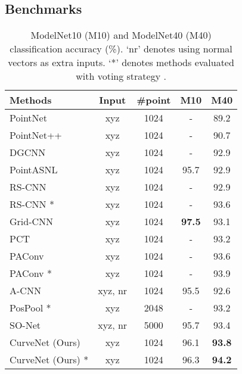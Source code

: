 \documentclass[10pt,twocolumn,letterpaper]{article}
\theoremstyle{definition}
\begin{document}
\subsection{Benchmarks}

\begin{table} 
	\begin{center}
	\caption{ModelNet10 (M10) and ModelNet40
(M40) classification accuracy (\%). `nr' denotes using normal vectors as extra inputs. `*' denotes methods evaluated with voting strategy \cite{liu2019relation}. }
		\begin{tabular}{l|cccc} 
			\toprule 
			Methods & Input & \#point & M10 & M40\\
			\hline
			\hline
			PointNet \cite{qi2017pointnet} & xyz & 1024 & - & 89.2\\
			PointNet++ \cite{qi2017pointnet++} & xyz & 1024 & - & 90.7\\
			DGCNN \cite{wang2019dynamic} & xyz & 1024 & - & 92.9 \\
PointASNL \cite{yan2020pointasnl} & xyz & 1024 & 95.7 & 92.9\\
RS-CNN \cite{liu2019relation} & xyz & 1024 & - & 92.9 \\
			RS-CNN \cite{liu2019relation} * & xyz & 1024 & - & 93.6 \\
			Grid-CNN \cite{xu2020grid} & xyz & 1024 &  \textbf{97.5} & 93.1 \\
PCT \cite{guo2020pct} & xyz & 1024 & - & 93.2 \\
			PAConv \cite{xu2021paconv} & xyz & 1024 & - & 93.6 \\
			PAConv \cite{xu2021paconv} * & xyz & 1024 & - & 93.9 \\
\hline
			A-CNN \cite{komarichev2019cnn} & xyz, nr & 1024 & 95.5 & 92.6\\
			PosPool \cite{liu2020closer} *& xyz & 2048 & - & 93.2 \\


			SO-Net \cite{li2018so} & xyz, nr & 5000 & 95.7 & 93.4\\
			\hline
CurveNet (Ours) & xyz & 1024 & 96.1 & \textbf{93.8}\\
CurveNet (Ours) * & xyz & 1024 & 96.3 & \textbf{94.2}\\
			\bottomrule
		\end{tabular}
		
		\label{table:modelnet}

	\end{center}
\end{table} 
\end{document}
